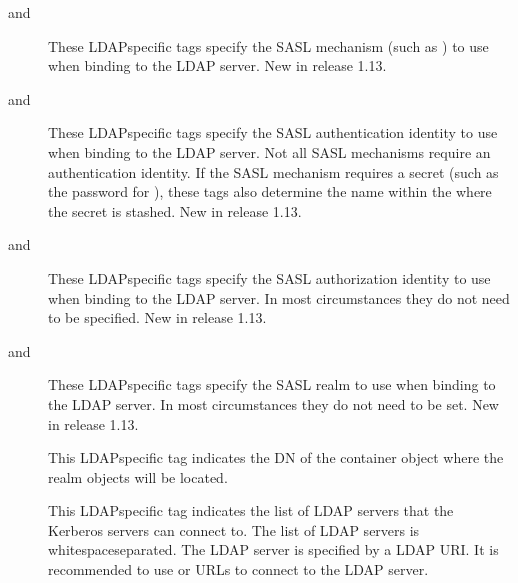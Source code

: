 \documentclass[letterpaper,10pt,english]{sphinxmanual}
\begin{document}
\begin{description}
\item[{ and }] \leavevmode
\sphinxAtStartPar
These LDAP\sphinxhyphen{}specific tags specify the SASL mechanism (such as
) to use when binding to the LDAP server.  New in
release 1.13.

\item[{ and }] \leavevmode
\sphinxAtStartPar
These LDAP\sphinxhyphen{}specific tags specify the SASL authentication identity
to use when binding to the LDAP server.  Not all SASL mechanisms
require an authentication identity.  If the SASL mechanism
requires a secret (such as the password for ), these
tags also determine the name within the
 where the secret is stashed.  New
in release 1.13.

\item[{ and }] \leavevmode
\sphinxAtStartPar
These LDAP\sphinxhyphen{}specific tags specify the SASL authorization identity
to use when binding to the LDAP server.  In most circumstances
they do not need to be specified.  New in release 1.13.

\item[{ and }] \leavevmode
\sphinxAtStartPar
These LDAP\sphinxhyphen{}specific tags specify the SASL realm to use when
binding to the LDAP server.  In most circumstances they do not
need to be set.  New in release 1.13.

\item[{}] \leavevmode
\sphinxAtStartPar
This LDAP\sphinxhyphen{}specific tag indicates the DN of the container object
where the realm objects will be located.

\item[{}] \leavevmode
\sphinxAtStartPar
This LDAP\sphinxhyphen{}specific tag indicates the list of LDAP servers that the
Kerberos servers can connect to.  The list of LDAP servers is
whitespace\sphinxhyphen{}separated.  The LDAP server is specified by a LDAP URI.
It is recommended to use  or  URLs to connect
to the LDAP server.


\end{description}
\end{document}
